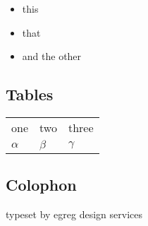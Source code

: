 \documentclass{article}
\begin{document}
\begin{itemize}
\item this
\item that
\item and the other
\end{itemize}


\subsection{Tables}



\begin{center}

\begin{tabular}{|l|l|l|}
\cline{1-3}
one & two & three\\
$\alpha$ & $\beta$ & $\gamma$\\
\cline{1-3}
\end{tabular}

\end{center}

\subsection{Colophon}
\raggedleft
typeset by egreg design services
\end{document}
